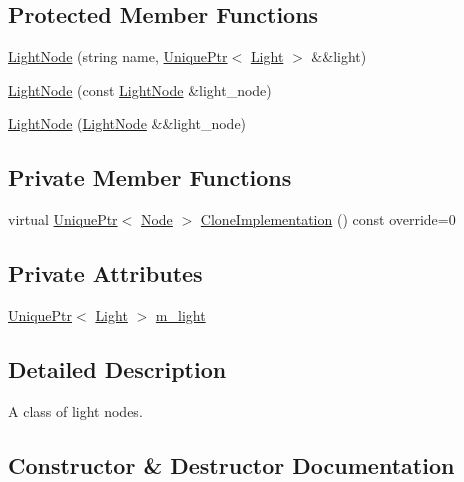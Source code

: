 \subsection*{Protected Member Functions}
\begin{DoxyCompactItemize}
\item 
\hyperlink{classmage_1_1_light_node_a765346a944f01d451db00b5aac545ea0}{Light\+Node} (string name, \hyperlink{namespacemage_a3316d7143a973e37adf1110f2e80ca31}{Unique\+Ptr}$<$ \hyperlink{classmage_1_1_light}{Light} $>$ \&\&light)
\item 
\hyperlink{classmage_1_1_light_node_afc1174329e2dbf2d349303fc396c3760}{Light\+Node} (const \hyperlink{classmage_1_1_light_node}{Light\+Node} \&light\+\_\+node)
\item 
\hyperlink{classmage_1_1_light_node_a0a2d5ee9e6417d73905d6f35116eccb3}{Light\+Node} (\hyperlink{classmage_1_1_light_node}{Light\+Node} \&\&light\+\_\+node)
\end{DoxyCompactItemize}
\subsection*{Private Member Functions}
\begin{DoxyCompactItemize}
\item 
virtual \hyperlink{namespacemage_a3316d7143a973e37adf1110f2e80ca31}{Unique\+Ptr}$<$ \hyperlink{classmage_1_1_node}{Node} $>$ \hyperlink{classmage_1_1_light_node_aea97601d0a4b8073a1c655ca334af242}{Clone\+Implementation} () const override=0
\end{DoxyCompactItemize}
\subsection*{Private Attributes}
\begin{DoxyCompactItemize}
\item 
\hyperlink{namespacemage_a3316d7143a973e37adf1110f2e80ca31}{Unique\+Ptr}$<$ \hyperlink{classmage_1_1_light}{Light} $>$ \hyperlink{classmage_1_1_light_node_aad97d01d2adb66eac0e93bdcdb919a05}{m\+\_\+light}
\end{DoxyCompactItemize}


\subsection{Detailed Description}
A class of light nodes. 

\subsection{Constructor \& Destructor Documentation}
\hypertarget{classmage_1_1_light_node_ad0c650ac0059589c28a3d1cfec95c07d}{}\label{classmage_1_1_light_node_ad0c650ac0059589c28a3d1cfec95c07d} 
